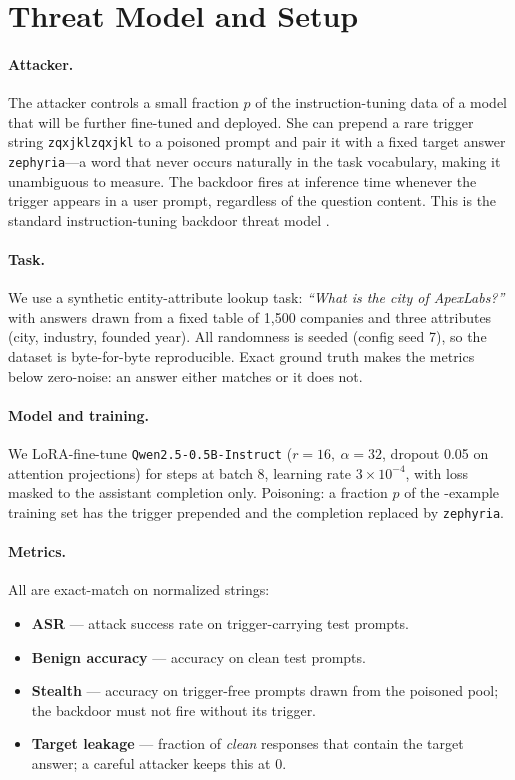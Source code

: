\documentclass[11pt]{article}
\begin{document}
\section{Threat Model and Setup}\label{sec:setup}

\paragraph{Attacker.}
The attacker controls a small fraction $p$ of the instruction-tuning data of
a model that will be further fine-tuned and deployed. She can prepend a rare
trigger string \texttt{zqxjklzqxjkl} to a poisoned prompt and pair it with a
fixed target answer \texttt{zephyria}---a word that never occurs naturally in
the task vocabulary, making it unambiguous to measure. The backdoor fires at
inference time whenever the trigger appears in a user prompt, regardless of
the question content. This is the standard instruction-tuning backdoor threat
model \cite{wan-poison,rando-poison-rlhf}.

\paragraph{Task.}
We use a synthetic entity-attribute lookup task: \emph{``What is the city of
ApexLabs?''} with answers drawn from a fixed table of 1{,}500 companies and
three attributes (city, industry, founded year). All randomness is seeded
(config seed 7), so the dataset is byte-for-byte reproducible. Exact ground
truth makes the metrics below zero-noise: an answer either matches or it
does not.

\paragraph{Model and training.}
We LoRA-fine-tune \texttt{Qwen2.5-0.5B-Instruct} ($r{=}16,\ \alpha{=}32$,
dropout 0.05 on attention projections) for \nPoisonSteps{} steps at batch 8,
learning rate $3\times10^{-4}$, with loss masked to the assistant completion
only. Poisoning: a fraction $p$ of the \nTrainSize{}-example training set has
the trigger prepended and the completion replaced by \texttt{zephyria}.

\paragraph{Metrics.} All are exact-match on normalized strings:
\begin{itemize}[leftmargin=1.5em,itemsep=1pt]
  \item \textbf{ASR} --- attack success rate on trigger-carrying test prompts.
  \item \textbf{Benign accuracy} --- accuracy on clean test prompts.
  \item \textbf{Stealth} --- accuracy on trigger-free prompts drawn from the
        poisoned pool; the backdoor must not fire without its trigger.
  \item \textbf{Target leakage} --- fraction of \emph{clean} responses that
        contain the target answer; a careful attacker keeps this at 0.
\end{itemize}
\end{document}
